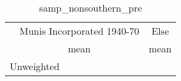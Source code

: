 \begin{table}[htbp]\centering
\def\sym#1{\ifmmode^{#1}\else\(^{#1}\)\fi}
\caption{samp\_nonsouthern\_pre \label{tab1}}
\begin{tabular}{l*{2}{c}}
\toprule
                    &\multicolumn{1}{c}{Munis Incorporated 1940-70}&\multicolumn{1}{c}{Else}\\
                    &        mean&        mean\\
\midrule
\bottomrule
\multicolumn{3}{l}{\footnotesize Unweighted}\\
\end{tabular}
\end{table}
